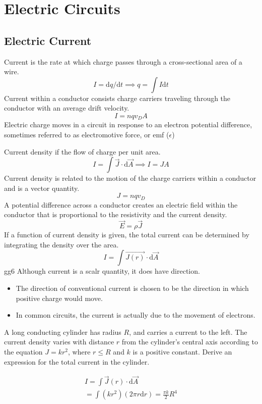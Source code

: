 \documentclass[../em.tex]{subfiles}
\begin{document}
\chapter{Electric Circuits}
\section{Electric Current}
Current is the rate at which charge passes through a cross-sectional area of a wire.
\[I=\mathrm{d}q/\mathrm{d}t \implies q = \int I \mathrm{d}t\]
Current within a conductor consists charge carriers traveling through the conductor with an average drift velocity.
\[I=nqv_D A\]
Electric charge moves in a circuit in response to an electron potential difference, sometimes referred to as electromotive force, or emf ($\epsilon$)

Current density if the flow of charge per unit area.
\[I=\int{\vec{J}\cdot\mathrm{d}\vec{A}} \implies I = JA\]
Current density is related to the motion of the charge carriers within a conductor and is a vector quantity.
\[J=nqv_D\]
A potential difference across a conductor creates an electric field within the conductor that is proportional to the resistivity and the current density.
\[\vec{E}=\rho \vec{J}\]
If a function of current density is given, the total current can be determined by integrating the density over the area.
\[I=\int \vec{J(r)}\cdot\mathrm{d}\vec{A}\]gg6
Although current is a scalr quantity, it does have direction.
\begin{itemize}
    \item The direction of conventional current is chosen to be the direction in which positive charge would move.
    \item In common circuits, the current is actually due to the movement of electrons.
\end{itemize}

\begin{example}
    A long conducting cylinder has radius $R$, and carries a current to the left. The current density varies with distance 
    $r$ from the cylinder's central axis according to the equation $J=kr^2$, where $r\leq R$ and $k$ is a positive constant. Derive an expression
    for the total current in the cylinder.

    \begin{align*}
        I=\int\vec{J}(r)\cdot\mathrm{d}\vec{A} \\
        = \int (kr^2)(2\pi r\mathrm{d}r)
        = \frac{\pi k}{2}R^4
    \end{align*}
\end{example}
\end{document}
